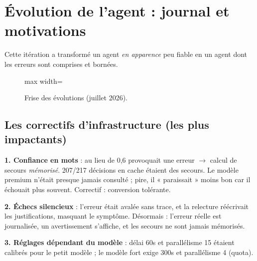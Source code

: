 \documentclass[11pt,a4paper]{report}
\newcommand{\code}[1]{\texttt{\detokenize{#1}}}
\newenvironment{fitpic}{\begin{center}\begin{adjustbox}{max width=\linewidth}}{\end{adjustbox}\end{center}}
\begin{document}
\chapter{Évolution de l'agent : journal et motivations}

Cette itération a transformé un agent \emph{en apparence} peu fiable en un agent dont les erreurs sont comprises et bornées.

\begin{figure}[h]
\begin{fitpic}
\end{fitpic}
\caption{Frise des évolutions (juillet 2026).}
\end{figure}

\section{Les correctifs d'infrastructure (les plus impactants)}
\begin{motiv}
\textbf{1. Confiance en mots} : \code{"medium"} au lieu de 0,6 provoquait une erreur $\rightarrow$ calcul de secours \emph{mémorisé}. 207/217 décisions en cache étaient des secours. Le modèle premium n'était presque jamais consulté ; pire, il « paraissait » moins bon car il échouait plus souvent. Correctif : conversion tolérante.
\end{motiv}
\begin{motiv}
\textbf{2. Échecs silencieux} : l'erreur était avalée sans trace, et la relecture réécrivait les justifications, masquant le symptôme. Désormais : l'erreur réelle est journalisée, un avertissement s'affiche, et les secours ne sont jamais mémorisés.
\end{motiv}
\begin{motiv}
\textbf{3. Réglages dépendant du modèle} : délai 60s et parallélisme 15 étaient calibrés pour le petit modèle ; le modèle fort exige 300s et parallélisme 4 (quota).
\end{motiv}
\end{document}
